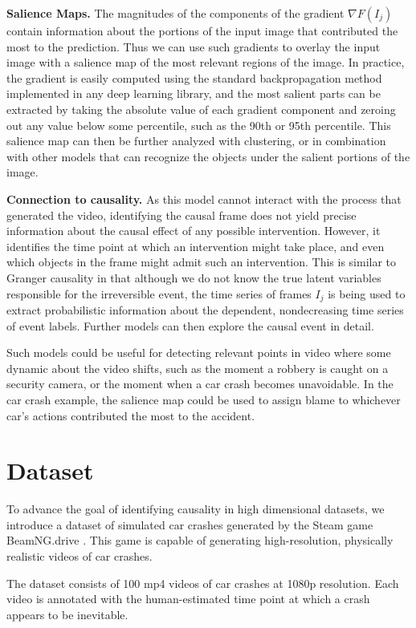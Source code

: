 \documentclass[letterpaper]{article} %
\begin{document}
\noindent \textbf{Salience Maps.} The magnitudes of the components of the gradient $\nabla F(I_j)$ contain information about the portions of the input image that contributed the most to the prediction. Thus we can use such gradients to overlay the input image with a salience map of the most relevant regions of the image. In practice, the gradient is easily computed using the standard backpropagation method implemented in any deep learning library, and the most salient parts can be extracted by taking the absolute value of each gradient component and zeroing out any value below some percentile, such as the 90th or 95th percentile. This salience map can then be further analyzed with clustering, or in combination with other models that can recognize the objects under the salient portions of the image.

\noindent \textbf{Connection to causality.} As this model cannot interact with the process that generated the video, identifying the causal frame does not yield precise information about the causal effect of any possible intervention. However, it identifies the time point at which an intervention might take place, and even which objects in the frame might admit such an intervention. This is similar to Granger causality in that although we do not know the true latent variables responsible for the irreversible event,  the time series of frames $I_j$ is being used to extract probabilistic information about the dependent, nondecreasing time series of event labels. Further models can then explore the causal event in detail. 

Such models could be useful for detecting relevant points in video where some dynamic about the video shifts, such as the moment a robbery is caught on a security camera, or the moment when a car crash becomes unavoidable. In the car crash example, the salience map could be used to assign blame to whichever car's actions contributed the most to the accident.


\section{Dataset}

To advance the goal of identifying causality in high dimensional datasets, we introduce a dataset of simulated car crashes generated by the Steam game BeamNG.drive \cite{beamng}. This game is capable of generating high-resolution, physically realistic videos of car crashes.

The dataset consists of 100 mp4 videos of car crashes at 1080p resolution. Each video is annotated with the human-estimated time point at which a crash appears to be inevitable. %
\end{document}
